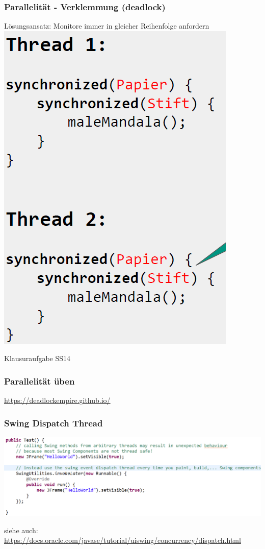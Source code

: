 \documentclass[18pt]{beamer}
\begin{document}
	
	\begin{frame}
		\frametitle{Parallelität - Verklemmung (deadlock)}
		\centering Lösungsansatz: Monitore immer in gleicher Reihenfolge anfordern \linebreak
		\includegraphics[scale=0.4]{./pics/tut5/deadlock-ex-sol.png}
	\end{frame}
	
	\begin{frame}
		\centering
		\begin{huge}
			Klausuraufgabe SS14
		\end{huge}
	\end{frame}
	
	\begin{frame}
		\frametitle{Parallelität üben}
		\centering \huge \url{https://deadlockempire.github.io/}
	\end{frame}
	
	
	\begin{frame}
		\frametitle{Swing Dispatch Thread}
		\includegraphics[scale=0.35]{./pics/tut5/edt.png}
		\begin{tiny}
			siehe auch: \url{https://docs.oracle.com/javase/tutorial/uiswing/concurrency/dispatch.html}
		\end{tiny}
	\end{frame}
\end{document}
